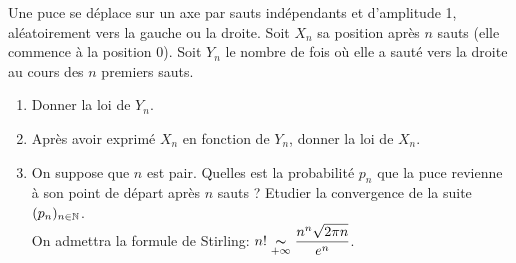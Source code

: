 \documentclass[a4paper, 11pt,reqno]{article}
\begin{document}
\begin{exercice}  \;
	Une puce se d\'eplace sur un axe par sauts ind\'ependants et d'amplitude 1, al\'eatoirement vers la gauche ou la droite. Soit $X_n$ sa position apr\`es $n$ sauts (elle commence \`a la position 0). Soit $Y_n$ le nombre de fois o\`u elle a saut\'e vers la droite au cours des $n$ premiers sauts.
	\begin{enumerate}
		\item Donner la loi de $Y_n$.
		\item Apr\`es avoir exprim\'e $X_n$ en fonction de $Y_n$, donner la loi de $X_n$.
		\item On suppose que $n$ est pair. Quelles est la probabilit\'e $p_n$ que la puce revienne \`a son point de d\'epart apr\`es $n$ sauts ? Etudier la convergence de la suite $(p_n)_{n\in\mathbb{N}}$. \\
		      \noindent On admettra la formule de Stirling: $n!\underset{+\infty}{\thicksim} \displaystyle\frac{n^n \sqrt{2\pi n}}{e^n}$.
	\end{enumerate}
\end{exercice}
\end{document}
